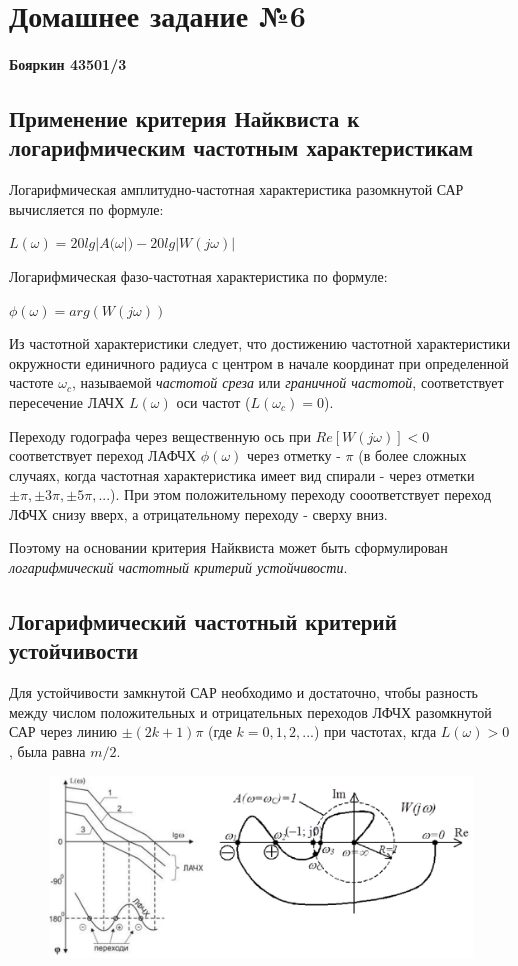 \documentclass[14pt,a4paper,report]{report}
\begin{document}
\chapter{Домашнее задание №6}

\subsubsection{Бояркин 43501/3}

\section{Применение критерия Найквиста к логарифмическим частотным характеристикам}

Логарифмическая амплитудно-частотная характеристика разомкнутой САР вычисляется по формуле:

\begin{center}
$L(\omega)=20lg|A(\omega|)-20lg|W(j\omega)|$
\end{center}

Логарифмическая фазо-частотная характеристика по формуле:

\begin{center}
$\phi(\omega)=arg(W(j\omega))$
\end{center}

Из частотной характеристики следует, что достижению частотной характеристики окружности единичного радиуса с центром в начале координат при определенной частоте $\omega_c$, называемой \emph{частотой среза} или \emph{граничной частотой}, соответствует пересечение ЛАЧХ $L(\omega)$ оси частот ($L(\omega_c)=0$).

Переходу годографа через вещественную ось при $Re[W(j\omega)]<0$ соответствует переход ЛАФЧХ $\phi(\omega)$ через отметку - $\pi$ (в более сложных случаях, когда частотная характеристика имеет вид спирали - через отметки $\pm \pi, \pm 3\pi, \pm 5\pi, ...$). При этом положительному переходу сооответствует переход ЛФЧХ снизу вверх, а отрицательному переходу - сверху вниз.

Поэтому на основании критерия Найквиста может быть сформулирован \emph{логарифмический частотный критерий устойчивости}.

\section{Логарифмический частотный критерий устойчивости}

Для устойчивости замкнутой САР необходимо и достаточно, чтобы разность между числом положительных и отрицательных переходов ЛФЧХ разомкнутой САР через линию $\pm (2k+1)\pi$ (где $k=0,1,2,...$) при частотах, кгда $L(\omega)>0$, была равна $m/2$.

\begin{figure}[h!]
	\centering
	\includegraphics[scale = 0.62]{images/1.png}
	
	\caption{}
	\label{image:20}
\end{figure}
\end{document}
